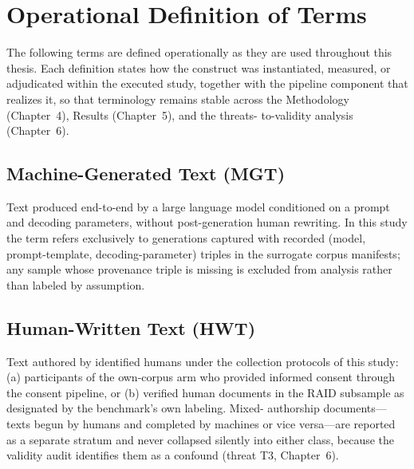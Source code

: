 
\chapter{Operational Definition of Terms}

The following terms are defined operationally as they are used throughout
this thesis. Each definition states how the construct was instantiated,
measured, or adjudicated within the executed study, together with the
pipeline component that realizes it, so that terminology remains stable
across the Methodology (Chapter~4), Results (Chapter~5), and the threats-
to-validity analysis (Chapter~6).

\section{Machine-Generated Text (MGT)}
Text produced end-to-end by a large language model conditioned on a prompt
and decoding parameters, without post-generation human rewriting. In this
study the term refers exclusively to generations captured with recorded
(model, prompt-template, decoding-parameter) triples in the surrogate
corpus manifests; any sample whose provenance triple is missing is excluded
from analysis rather than labeled by assumption.

\section{Human-Written Text (HWT)}
Text authored by identified humans under the collection protocols of this
study: (a) participants of the own-corpus arm who provided informed
consent through the consent pipeline, or (b) verified human documents in
the RAID subsample as designated by the benchmark's own labeling. Mixed-
authorship documents---texts begun by humans and completed by machines or
vice versa---are reported as a separate stratum and never collapsed
silently into either class, because the validity audit identifies them as
a confound (threat T3, Chapter~6).

